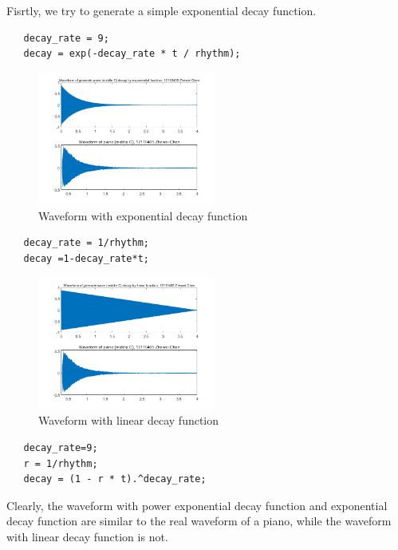 \documentclass[journal]{IEEEtran}
\begin{document}
Fisrtly, we try to generate a simple exponential decay function. 
\begin{lstlisting}[style=Matlab-editor]
   %Exponential decay function
   decay_rate = 9; 
   decay = exp(-decay_rate * t / rhythm);
\end{lstlisting}
\begin{figure}[htbp]
   \centering
   \includegraphics[width=0.52\textwidth]{p2.png} 
   \caption{Waveform with exponential decay function}
   \label{fig:2}
   \end{figure}
\begin{lstlisting}[style=Matlab-editor]
   % Linear deacy function
   decay_rate = 1/rhythm;
   decay =1-decay_rate*t;
   \end{lstlisting}
   \begin{figure}[htbp]
      \centering
      \includegraphics[width=0.52\textwidth]{p3.png} 
      \caption{Waveform with linear decay function}
      \label{fig:3}
      \end{figure}
   
\begin{lstlisting}[style=Matlab-editor]
   %Power exponential decay function
   decay_rate=9;
   r = 1/rhythm;  
   decay = (1 - r * t).^decay_rate; 
   \end{lstlisting}

Clearly, the waveform with power exponential decay function and exponential decay function are similar to the real waveform of a piano, while the waveform with linear decay function is not.
\end{document}
